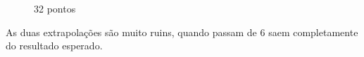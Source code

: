 \documentclass[brazilian,12pt,a4paper,final]{article}
\begin{document}
\begin{figure}[htbp]
\begin{center}
\caption{32 pontos}
\label{fig_rotacao}
\end{center}
\end{figure}

As duas extrapolações são muito ruins, quando passam de 6 saem completamente
do resultado esperado.
\end{document}
